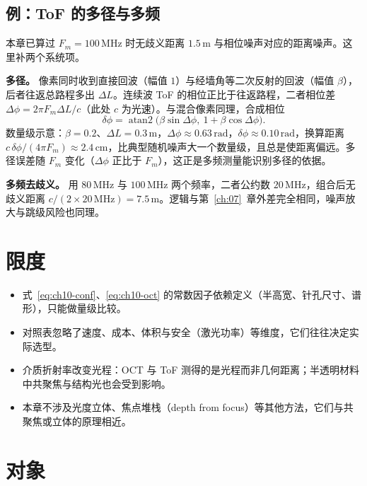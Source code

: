\subsection{例：ToF 的多径与多频}

本章已算过 $F_m=100\,\mathrm{MHz}$ 时无歧义距离 $1.5\,\mathrm{m}$ 与相位噪声对应的距离噪声。这里补两个系统项。

\textbf{多径。} 像素同时收到直接回波（幅值 $1$）与经墙角等二次反射的回波（幅值 $\beta$），后者往返总路程多出 $\Delta L$。连续波 ToF 的相位正比于往返路程，二者相位差 $\Delta\phi=2\pi F_m\Delta L/c$（此处 $c$ 为光速）。与混合像素同理，合成相位
\[
  \delta\phi=\operatorname{atan2}\bigl(\beta\sin\Delta\phi,\ 1+\beta\cos\Delta\phi\bigr).
\]
数量级示意：$\beta=0.2$、$\Delta L=0.3\,\mathrm{m}$，$\Delta\phi\approx0.63\,\mathrm{rad}$，$\delta\phi\approx0.10\,\mathrm{rad}$，换算距离 $c\,\delta\phi/(4\pi F_m)\approx2.4\,\mathrm{cm}$，比典型随机噪声大一个数量级，且总是使距离偏远。多径误差随 $F_m$ 变化（$\Delta\phi$ 正比于 $F_m$），这正是多频测量能识别多径的依据。

\textbf{多频去歧义。} 用 $80\,\mathrm{MHz}$ 与 $100\,\mathrm{MHz}$ 两个频率，二者公约数 $20\,\mathrm{MHz}$，组合后无歧义距离 $c/(2\times20\,\mathrm{MHz})=7.5\,\mathrm{m}$。逻辑与第~\ref{ch:07}~章外差完全相同，噪声放大与跳级风险也同理。

\section{限度}
\label{sec:ch09-limits}

\begin{itemize}
  \item 式~\eqref{eq:ch10-conf}、\eqref{eq:ch10-oct} 的常数因子依赖定义（半高宽、针孔尺寸、谱形），只能做量级比较。
  \item 对照表忽略了速度、成本、体积与安全（激光功率）等维度，它们往往决定实际选型。
  \item 介质折射率改变光程：OCT 与 ToF 测得的是光程而非几何距离；半透明材料中共聚焦与结构光也会受到影响。
  \item 本章不涉及光度立体、焦点堆栈（depth from focus）等其他方法，它们与共聚焦或立体的原理相近。
\end{itemize}

\section{对象}
\label{sec:ch09-object}

